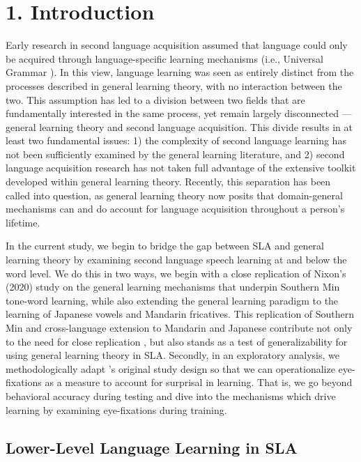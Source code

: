 \section{1. Introduction}

Early research in second language acquisition assumed that language could only be acquired through language-specific learning mechanisms (i.e., Universal Grammar \parencite{chomsky1965}). In this view, language learning was seen as entirely distinct from the processes described in general learning theory, with no interaction between the two. This assumption has led to a division between two fields that are fundamentally interested in the same process, yet remain largely disconnected — general learning theory and second language acquisition. This divide results in at least two fundamental issues: 1) the complexity of second language learning has not been sufficiently examined by the general learning literature, and 2) second language acquisition research has not taken full advantage of the extensive toolkit developed within general learning theory. Recently, this separation has been called into question, as general learning theory now posits that domain-general mechanisms can and do account for language acquisition throughout a person’s lifetime.

In the current study, we begin to bridge the gap between SLA and general learning theory by examining second language speech learning at and below the word level. We do this in two ways, we begin with a close replication of Nixon’s (2020) study on the general learning mechanisms that underpin Southern Min tone-word learning, while also extending the general learning paradigm to the learning of Japanese vowels and Mandarin fricatives. This replication of Southern Min and cross-language extension to Mandarin and Japanese contribute not only to the need for close replication \parencite{Marsden_2018}, but also stands as a test of generalizability for using general learning theory in SLA. Secondly, in an exploratory analysis, we methodologically adapt \textcite{nixon2020mice}'s original study design so that we can operationalize eye-fixations as a measure to account for surprisal in learning. That is, we go beyond behavioral accuracy during testing and dive into the mechanisms which drive learning by examining eye-fixations during training. 

\subsection{Lower-Level Language Learning in SLA}

